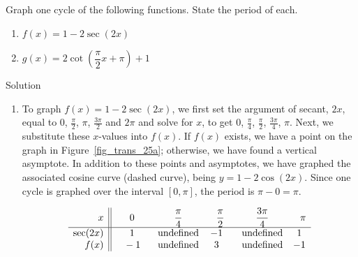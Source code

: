 \begin{example}
 \label{seccscgraphex} Graph one cycle of the following functions.  State the period of each.

\begin{multicols}{2}

\begin{enumerate}

\item  $f(x) = 1 - 2 \sec(2x)$

\item  $g(x) = 2\cot\left(\dfrac{\pi}{2} x + \pi\right) + 1$

\end{enumerate}

\end{multicols}

Solution 

\begin{enumerate}

\item  To graph $f(x) = 1 - 2 \sec(2x)$, we first set the argument of secant, $2x$, equal to $0$, $\frac{\pi}{2}$, $\pi$, $\frac{3\pi}{2}$ and $2\pi$ and solve for $x$, to get 0, $\frac{\pi}{4}$, $\frac{\pi}{2}$, $\frac{3\pi}{4}$, $\pi$. Next, we substitute these $x$-values into $f(x)$.  If $f(x)$ exists, we have a point on the graph in Figure~\ref{fig_trans_25a};  otherwise, we have found a vertical asymptote.  In addition to these points and asymptotes, we have graphed the associated cosine curve (dashed curve), being $y = 1 - 2 \cos(2x)$.  Since one cycle is graphed over the interval $[0,\pi]$, the period is $\pi - 0 = \pi$.

\renewcommand{\arraystretch}{2}
\[ \begin{array}{r||ccccc}  
x         & \hphantom{-}0  & \hphantom{-}\dfrac{\pi}{4} & \hphantom{-}\dfrac{\pi}{2}  &  \hphantom{-}\dfrac{3\pi}{4} & \hphantom{-}\pi   \\[0.1cm] \hline 
\sec(2x)  &  \hphantom{-}1  & \hphantom{-}\text{undefined}  & -1  &  \hphantom{-}\text{undefined} & 1 \\
 f(x)   & \hphantom{-}-1  & \hphantom{-}\text{undefined}  & 3  &  \hphantom{-}\text{undefined} & -1 \\
\end{array} \]
\renewcommand{\arraystretch}{1}
%


\end{enumerate}
\end{example}
